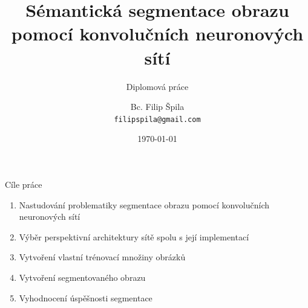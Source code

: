 \documentclass[aspectratio=1610]{beamer}
\title[Sémantická segmentace obrazu pomocí CNN]
{Sémantická segmentace obrazu pomocí konvolučních neuronových sítí}
\subtitle
{Diplomová práce}
\author[Bc. Filip Špila]
{Bc. Filip Špila \\
	\texttt{filipspila@gmail.com}}
\institute
{Ústav mechaniky těles, mechatroniky a biomechaniky \\
	Vysoké učení technické v Brně
}
\date{\today}
\begin{document}
	
	
	\begin{frame}
	\titlepage
	\end{frame}


\begin{frame}{Cíle práce}
	\begin{enumerate}
		\item Nastudování problematiky segmentace obrazu pomocí konvolučních neuronových sítí
		\item Výběr perspektivní architektury sítě spolu s její implementací
		\item Vytvoření vlastní trénovací množiny obrázků
		\item Vytvoření segmentovaného obrazu
		\item Vyhodnocení úspěšnosti segmentace
	\end{enumerate}	
\end{frame}

\end{document}

